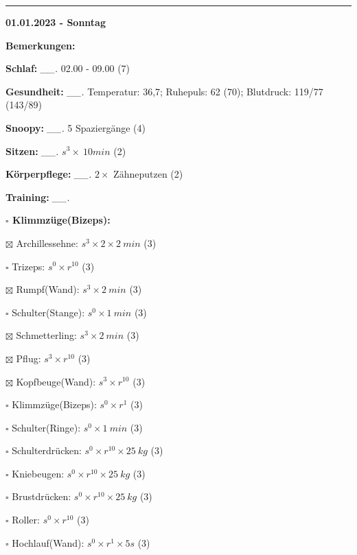 \documentclass[10pt,a4paper]{article}
\newcommand\prop[1] {{\color {alizarin} {\bf #1}}}             %
\newcommand\rele[1] {{\color {english} \bf {#1}}}              %
\newcommand\mand[1] {{\color {burntorange} {\bf #1}}}          %
\newcommand\ddivide {\vskip -9pt \hrule \vskip 6pt}
\newcommand\topspace{\vskip -15pt \hskip 20pt}
\newcommand\n[1] { {\sl #1.} \hskip 5pt }
\begin{document}
\ddivide
{\rele {01.01.2023 - Sonntag}}

\begin{mdframed}[style=daystyle]
  \begin{labeling}{{\mand {Bemerkungen:}}}
    \setlength\itemsep{-3pt}
  \item[{\mand {Schlaf:}}]        \n{\_\_} 02.00 - 09.00 (7)
  \item[{\mand {Gesundheit:}}]    \n{\_\_} Temperatur: 36,7; Ruhepuls: 62 (70); Blutdruck: 119/77 (143/89)
  \item[{\mand {Snoopy:}}]        \n{\_\_} 5 Spaziergänge (4)
  \item[{\mand {Sitzen:}}]        \n{\_\_} $s^3 \times\ 10 min$ (2)
  \item[{\mand {Körperpflege:}}]  \n{\_\_} $2 \times$ Zähneputzen (2)
  \item[{\mand {Training:}}]      \n{\_\_}
    \topspace
    \begin{minipage}{0.75\textwidth}  
      \begin{labeling}{\prop {$\square$ {Klimmzüge(Bizeps):}}}
        \setlength\itemsep{-3pt}
      \item[$\boxtimes$ Archillessehne:]    $s^3 \times 2 \times 2\ min$ (3)
      \item[$\square$ Trizeps:]           $s^0 \times r^{10}$ (3)
      \item[$\boxtimes$ Rumpf(Wand):]       $s^3 \times 2\ min$ (3)
      \item[$\square$ Schulter(Stange):]  $s^0 \times 1\ min$ (3)
      \item[$\boxtimes$ Schmetterling:]     $s^3 \times 2\ min$ (3)
      \item[$\boxtimes$ Pflug:]             $s^3 \times r^{10}$ (3)
      \item[$\boxtimes$ Kopfbeuge(Wand):]   $s^3 \times r^{10}$ (3)
      \item[$\square$ Klimmzüge(Bizeps):] $s^0 \times r^1$ (3)
      \item[$\square$ Schulter(Ringe):]   $s^0 \times 1\ min$ (3)
      \item[$\square$ Schulterdrücken:]   $s^0 \times r^{10} \times 25\ kg$ (3)
      \item[$\square$ Kniebeugen:]        $s^0 \times r^{10} \times 25\ kg$ (3)
      \item[$\square$ Brustdrücken:]      $s^0 \times r^{10} \times 25\ kg$ (3)
      \item[$\square$ Roller:]            $s^0 \times r^{10}$ (3)
      \item[$\square$ Hochlauf(Wand):]    $s^0 \times r^{1} \times 5s$ (3)

\end{labeling}
\end{minipage}
\end{labeling}
\end{mdframed}
\end{document}
